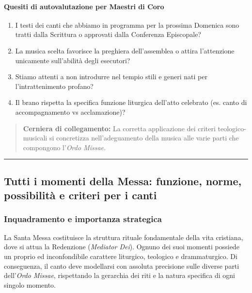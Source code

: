 \documentclass[12pt,a4paper]{article}
\begin{document}
	\paragraph{Quesiti di autovalutazione per Maestri di Coro}\label{quesiti-di-autovalutazione-per-maestri-di-coro}
	
	\begin{enumerate}[label=\arabic*.,leftmargin=*]
		\item I testi dei canti che abbiamo in programma per la prossima Domenica sono tratti dalla Scrittura o approvati dalla Conferenza Episcopale?
		\item La musica scelta favorisce la preghiera dell'assemblea o attira l'attenzione unicamente sull'abilità degli esecutori?
		\item Stiamo attenti a non introdurre nel tempio stili e generi nati per l'intrattenimento profano?
		\item Il brano rispetta la specifica funzione liturgica dell'atto celebrato (es. canto di accompagnamento vs acclamazione)?
	\end{enumerate}
	
	\begin{quote}
		\textbf{Cerniera di collegamento:} La corretta applicazione dei criteri teologico-musicali si concretizza nell'adeguamento della musica alle varie parti che compongono l'\emph{Ordo Missae}.
	\end{quote}
	
	\begin{center}\rule{0.5\linewidth}{0.5pt}\end{center}
	
	\subsection{Tutti i momenti della Messa: funzione, norme, possibilità e criteri per i canti}\label{tutti-i-momenti-della-messa-funzione-norme-possibilita-e-criteri-per-i-canti}
	
	\subsubsection{Inquadramento e importanza strategica}\label{inquadramento-e-importanza-strategica-6}
	
	La Santa Messa costituisce la struttura rituale fondamentale della vita cristiana, dove si attua la Redenzione (\emph{Mediator Dei}). Ognuno dei suoi momenti possiede un proprio ed inconfondibile carattere liturgico, teologico e drammaturgico. Di conseguenza, il canto deve modellarsi con assoluta precisione sulle diverse parti dell'\emph{Ordo Missae}, rispettando la gerarchia dei riti e la natura specifica di ogni singolo momento.
	
\end{document}
